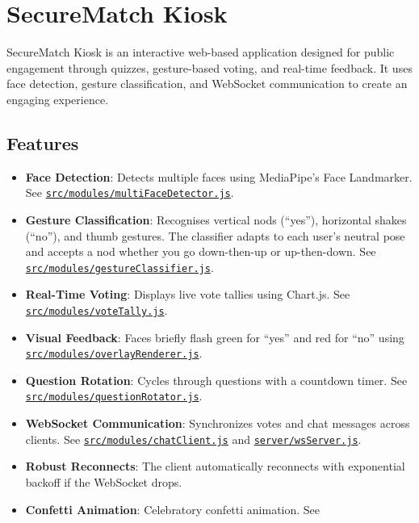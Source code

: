 \section{SecureMatch Kiosk}\label{securematch-kiosk}

SecureMatch Kiosk is an interactive web-based application designed for
public engagement through quizzes, gesture-based voting, and real-time
feedback. It uses face detection, gesture classification, and WebSocket
communication to create an engaging experience.

\subsection{Features}\label{features}

\begin{itemize}
\tightlist
\item
  \textbf{Face Detection}: Detects multiple faces using MediaPipe's Face
  Landmarker. See
  \href{src/modules/multiFaceDetector.js}{\texttt{src/modules/multiFaceDetector.js}}.
\item
  \textbf{Gesture Classification}: Recognises vertical nods (``yes''),
  horizontal shakes (``no''), and thumb gestures. The classifier adapts
  to each user's neutral pose and accepts a nod whether you go
  down-then-up or up-then-down. See
  \href{src/modules/gestureClassifier.js}{\texttt{src/modules/gestureClassifier.js}}.
\item
  \textbf{Real-Time Voting}: Displays live vote tallies using Chart.js.
  See
  \href{src/modules/voteTally.js}{\texttt{src/modules/voteTally.js}}.
\item
  \textbf{Visual Feedback}: Faces briefly flash green for ``yes'' and
  red for ``no'' using
  \href{src/modules/overlayRenderer.js}{\texttt{src/modules/overlayRenderer.js}}.
\item
  \textbf{Question Rotation}: Cycles through questions with a countdown
  timer. See
  \href{src/modules/questionRotator.js}{\texttt{src/modules/questionRotator.js}}.
\item
  \textbf{WebSocket Communication}: Synchronizes votes and chat messages
  across clients. See
  \href{src/modules/chatClient.js}{\texttt{src/modules/chatClient.js}}
  and \href{server/wsServer.js}{\texttt{server/wsServer.js}}.
\item
  \textbf{Robust Reconnects}: The client automatically reconnects with
  exponential backoff if the WebSocket drops.
\item
  \textbf{Confetti Animation}: Celebratory confetti animation. See

\end{itemize}
